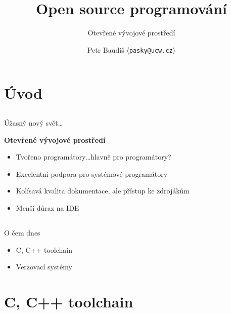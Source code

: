 \documentclass{beamer}
\begin{document}

\title{Open source programování}
\subtitle{Otevřené vývojové prostředí}
\author{Petr Baudiš $\langle${\tt pasky@ucw.cz}$\rangle$}
\date{}
\frame{\titlepage}

\section{Úvod}

\subsection{}
\begin{frame}{Úžasný nový svět\dots}
\begin{center}
{\bf Otevřené vývojové prostředí}
\end{center}
\begin{itemize}
\item Tvořeno programátory\dots hlavně pro programátory?
\item Excelentní podpora pro systémové programátory
\item Kolísavá kvalita dokumentace, ale přístup ke zdrojákům
\item Menší důraz na IDE
\end{itemize}
\end{frame}

\subsection{}
\begin{frame}{O čem dnes}
\begin{itemize}
\item C, C++ toolchain
\item Verzovací systémy
\end{itemize}
\end{frame}


\section{C, C++ toolchain}
\end{document}
